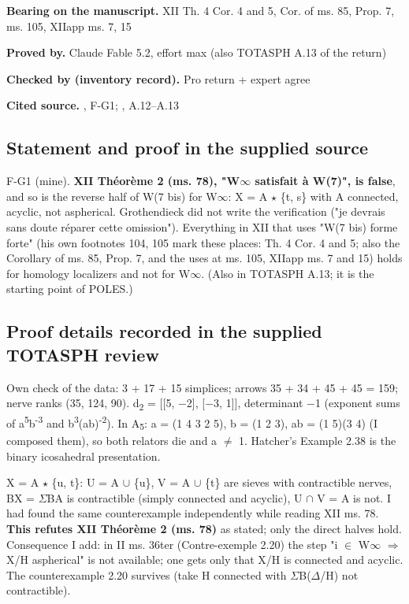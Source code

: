 \noindent\textbf{Bearing on the manuscript.} XII Th. 4 Cor. 4 and 5, Cor. of ms. 85, Prop. 7, ms. 105, XIIapp ms. 7, 15\par\smallskip

\noindent\textbf{Proved by.} Claude Fable 5.2, effort max (also TOTASPH A.13 of the return)\par

\noindent\textbf{Checked by (inventory record).} Pro return + expert agree\par\smallskip

\noindent\textbf{Cited source.} , F-G1; , A.12--A.13\par\medskip

\subsection*{Statement and proof in the supplied source}

F-G1 (mine). \textbf{XII Théorème 2 (ms. 78), "W\ensuremath{\infty} satisfait à W(7)", is false}, and so is the reverse half of   W(7 bis) for W\ensuremath{\infty}: X = A \ensuremath{\star} \{t, s\} with A connected, acyclic, not aspherical. Grothendieck did not write the   verification ("je devrais sans doute réparer cette omission"). Everything in XII that uses "W(7 bis) forme forte"   (his own footnotes 104, 105 mark these places: Th. 4 Cor. 4 and 5; also the Corollary of ms. 85, Prop. 7, and   the uses at ms. 105, XIIapp ms. 7 and 15) holds for homology localizers and not for W\ensuremath{\infty}. (Also in TOTASPH A.13;   it is the starting point of POLES.)

\subsection*{Proof details recorded in the supplied TOTASPH review}
Own check of the data: 3 + 17 + 15 simplices; arrows 35 + 34 + 45 + 45 = 159; nerve ranks (35, 124, 90). d\textsubscript{2} = [[5, \ensuremath{-}2], [\ensuremath{-}3, 1]], determinant \ensuremath{-}1 (exponent sums of a\textsuperscript{5}b\textsuperscript{-3} and b\textsuperscript{3}(ab)\textsuperscript{-2}). In A\textsubscript{5}: a = (1 4 3 2 5), b = (1 2 3), ab = (1 5)(3 4) (I composed them), so both relators die and a \ensuremath{\ne} 1. Hatcher's Example 2.38 is the binary icosahedral presentation.

X = A \ensuremath{\star} \{u, t\}: U = A \ensuremath{\cup} \{u\}, V = A \ensuremath{\cup} \{t\} are sieves with contractible nerves, BX = \ensuremath{\Sigma}BA is contractible (simply connected and acyclic), U \ensuremath{\cap} V = A is not. I had found the same counterexample independently while reading XII ms. 78. \textbf{This refutes XII Théorème 2 (ms. 78)} as stated; only the direct halves hold. Consequence I add: in II ms. 36ter (Contre-exemple 2.20) the step "i \ensuremath{\in} W\ensuremath{\infty} \ensuremath{\Rightarrow} X/H aspherical" is not available; one gets only that X/H is connected and acyclic. The counterexample 2.20 survives (take H connected with \ensuremath{\Sigma}B(\ensuremath{\Delta}/H) not contractible).


